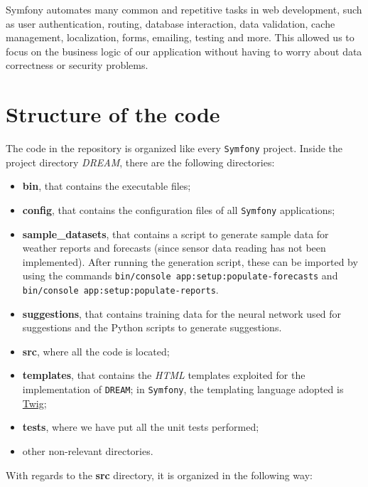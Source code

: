 \documentclass{article}
\begin{document}
Symfony automates many common and repetitive tasks in web development, such as user authentication, routing, database interaction, data validation, cache management, localization, forms, emailing, testing and more. This allowed us to focus on the business logic of our application without having to worry about data correctness or security problems.

\newpage
\section{Structure of the code}
The code in the repository is organized like every \verb|Symfony| project. Inside the project directory \textit{DREAM}, there are the following directories:
\begin{itemize}
    \item \textbf{bin}, that contains the executable files;
    \item \textbf{config}, that contains the configuration files of all \verb|Symfony| applications;
    \item \textbf{sample\_datasets}, that contains a script to generate sample data for weather reports and forecasts (since sensor data reading has not been implemented). After running the generation script, these can be imported by using the commands \verb|bin/console app:setup:populate-forecasts| and \verb|bin/console app:setup:populate-reports|.
    \item \textbf{suggestions}, that contains training data for the neural network used for suggestions and the Python scripts to generate suggestions.
    \item \textbf{src}, where all the code is located;
    \item \textbf{templates}, that contains the \textit{HTML} templates exploited for the implementation of \verb|DREAM|; in \verb|Symfony|, the templating language adopted is \href{https://twig.symfony.com/}{Twig};
    \item \textbf{tests}, where we have put all the unit tests performed;
    \item other non-relevant directories.
\end{itemize}
With regards to the \textbf{src} directory, it is organized in the following way:
\end{document}
